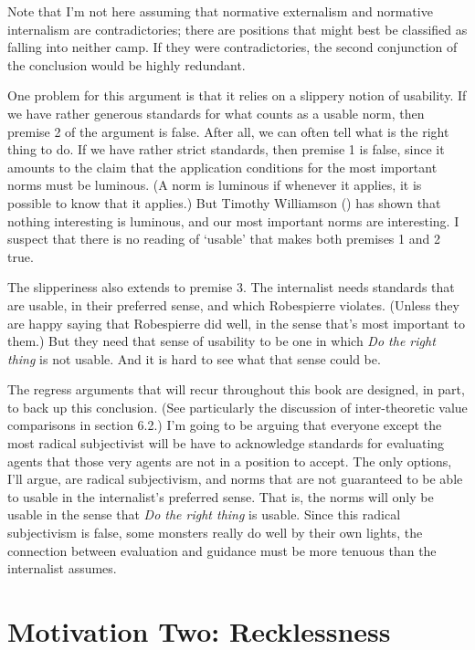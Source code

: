 \documentclass[
  10pt,
  letterpaper,
  twoside]{scrbook}
\begin{document}
Note that I'm not here assuming that normative externalism and normative
internalism are contradictories; there are positions that might best be
classified as falling into neither camp. If they were contradictories,
the second conjunction of the conclusion would be highly redundant.

One problem for this argument is that it relies on a slippery notion of
usability. If we have rather generous standards for what counts as a
usable norm, then premise 2 of the argument is false. After all, we can
often tell what is the right thing to do. If we have rather strict
standards, then premise 1 is false, since it amounts to the claim that
the application conditions for the most important norms must be
luminous. (A norm is luminous if whenever it applies, it is possible to
know that it applies.) But Timothy Williamson
() has shown that nothing interesting
is luminous, and our most important norms are interesting. I suspect
that there is no reading of `usable' that makes both premises 1 and 2
true.

The slipperiness also extends to premise 3. The internalist needs
standards that are usable, in their preferred sense, and which
{Robespierre} violates. (Unless they are happy saying that Robespierre
did well, in the sense that's most important to them.) But they need
that sense of usability to be one in which \emph{Do the right thing} is
not usable. And it is hard to see what that sense could be.

The regress arguments that will recur throughout this book are designed,
in part, to back up this conclusion. (See particularly the discussion of
inter-theoretic value comparisons in section 6.2.) I'm going to be
arguing that everyone except the most radical subjectivist will be have
to acknowledge standards for evaluating agents that those very agents
are not in a position to accept. The only options, I'll argue, are
radical subjectivism, and norms that are not guaranteed to be able to
usable in the internalist's preferred sense. That is, the norms will
only be usable in the sense that \emph{Do the right thing} is usable.
Since this radical subjectivism is false, some monsters really do well
by their own lights, the connection between evaluation and guidance must
be more tenuous than the internalist assumes.

\section{Motivation Two: Recklessness}\label{motivationtwo:recklessness}
\end{document}
